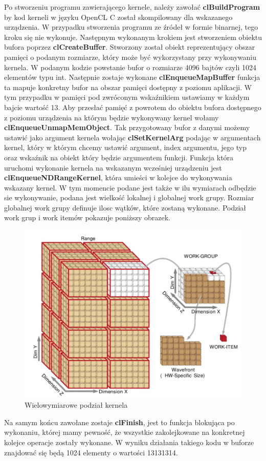 Po stworzeniu programu zawierającego kernele, należy zawołać \textbf{clBuildProgram} by kod kerneli w języku OpenCL C został skompilowany dla wskazanego urządzenia. W przypadku stworzenia programu ze źródeł w formie binarnej, tego kroku się nie wykonuje.
Następnym wykonanym krokiem jest stworzeniem obiektu bufora poprzez \textbf{clCreateBuffer}. Stworzony został obiekt reprezentujący obszar pamięci o podanym rozmiarze, który może być wykorzystany przy wykonywaniu kernela. W podanym kodzie powstanie bufor o rozmiarze 4096 bajtów czyli 1024 elementów typu int.
Następnie zostaje wykonane \textbf{clEnqueueMapBuffer} funkcja ta mapuje konkretny bufor na obszar pamięci dostępny z poziomu aplikacji. W tym przypadku w pamięci pod zwróconym wskaźnikiem ustawiamy w każdym bajcie wartość 13.
Aby przesłać pamięć z powrotem do obiektu bufora dostępnego z poziomu urządzenia na którym będzie wykonywany kernel wołamy \textbf{clEnqueueUnmapMemObject}.
Tak przygotowany bufor z danymi możemy ustawić jako argument kernela wołając \textbf{clSetKernelArg} podając w argumentach kernel, który w którym chcemy ustawić argument, index argumentu, jego typ oraz wskaźnik na obiekt który będzie argumentem funkcji.
Funkcja która uruchomi wykonanie kernela na wskazanym wcześniej urządzeniu jest \textbf{clEnqueueNDRangeKernel}, która umieści w kolejce do wykonywania wskazany kernel. W tym momencie podane jest także w ilu wymiarach odbędzie sie wykonywanie, podana jest wielkość lokalnej i globalnej work grupy. Rozmiar globalnej work grupy definuje ilosc wątków, które zostaną wykonane. Podział work grup i work itemów pokazuje poniższy obrazek.
\begin{figure}[H]
	\includegraphics[scale=0.35]{imgs/WorkDims.jpg}
	\caption{Wielowymiarowe podział kernela \cite{OpenCLProgramingGuide}}
\end{figure}
Na samym końcu zawołane zostaje \textbf{clFinish}, jest to funkcja blokująca po wykonaniu, której mamy pewność, że wszystkie zakolejkowane na konkretnej kolejce operacje zostały wykonane.
W wyniku działania takiego kodu w buforze znajdować się będą 1024 elementy o wartości 13131314.
